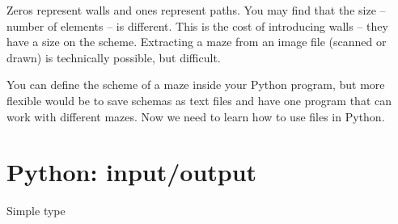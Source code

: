Zeros represent walls and ones represent paths. You may find that the
size -- number of elements -- is different. This is the cost of introducing
walls -- they have a size on the scheme. Extracting a maze from an
image file (scanned or drawn) is technically possible, but difficult.

You can define the scheme of a maze inside your Python program, but
more flexible would be to save schemas as text files and have one
program that can work with different mazes. Now we need to learn how
to use files in Python.

\section{Python: input/output}

Simple type



